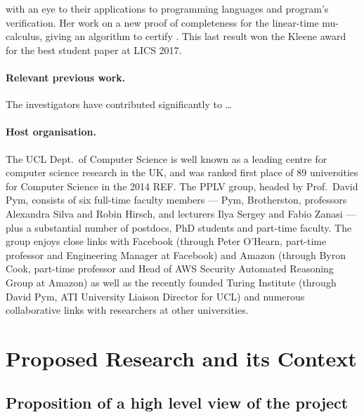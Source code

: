 \documentclass[11pt,twocolumn]{article}
\begin{document}
with an eye to their applications to programming languages and program's verification. Her work on a new proof of
completeness for the linear-time mu-calculus, giving an algorithm to certify . This last result won the Kleene award for the best student paper at LICS 2017. 

\paragraph{Relevant previous work.}
The investigators have contributed significantly to \ldots

\paragraph{Host organisation.}
The UCL Dept.\ of Computer Science is well known as a leading centre for computer science research in the UK, and was ranked first place of 89 universities for Computer Science in the 2014 REF. The PPLV group, headed by Prof.\ David Pym, consists of six full-time faculty members --- Pym, Brotherston, professors Alexandra Silva and Robin Hirsch, and lecturers Ilya Sergey and Fabio Zanasi --- plus a substantial number of postdocs, PhD students and part-time faculty. The group enjoys close links with Facebook (through Peter O'Hearn, part-time professor and Engineering Manager at Facebook) and Amazon (through Byron Cook, part-time professor and Head of AWS Security Automated Reasoning Group at Amazon) as well as the recently founded Turing Institute (through David Pym, ATI University Liaison Director for UCL) and numerous collaborative links with researchers at other universities.

\begingroup
\footnotesize
{}
\endgroup


%

\newpage

\section{Proposed Research and its Context}

\subsection{Proposition of a high level view of the project}
\end{document}

